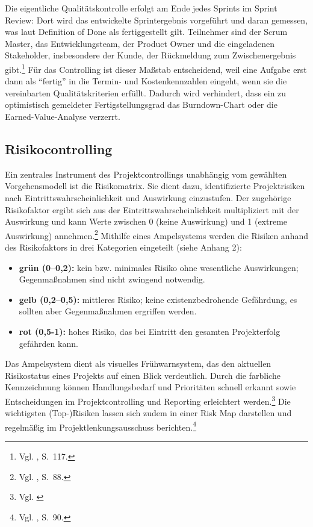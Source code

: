 \documentclass[
    12pt, 
    a4paper,
    ]{scrartcl} %
\begin{document}
Die eigentliche Qualitätskontrolle erfolgt am Ende jedes Sprints im Sprint Review: Dort wird das entwickelte Sprintergebnis vorgeführt und daran gemessen, was laut Definition of Done als fertiggestellt gilt. Teilnehmer sind der Scrum Master, das Entwicklungsteam, der Product Owner und die eingeladenen Stakeholder, insbesondere der Kunde, der Rückmeldung zum Zwischenergebnis gibt.\footnote{Vgl. \cite{Beiderwieden_ProjektmanagementIT}, S.~117.} Für das Controlling ist dieser Maßstab entscheidend, weil eine Aufgabe erst dann als \enquote{fertig} in die Termin- und Kostenkennzahlen eingeht, wenn sie die vereinbarten Qualitätskriterien erfüllt. Dadurch wird verhindert, dass ein zu optimistisch gemeldeter Fertigstellungsgrad das Burndown-Chart oder die Earned-Value-Analyse verzerrt.

\subsection{Risikocontrolling}
Ein zentrales Instrument des Projektcontrollings unabhängig vom gewählten Vorgehensmodell ist die Risikomatrix. Sie dient dazu, identifizierte Projektrisiken nach Eintrittswahrscheinlichkeit und Auswirkung einzustufen. Der zugehörige Risikofaktor ergibt sich aus der Eintrittswahrscheinlichkeit multipliziert mit der Auswirkung und kann Werte zwischen 0 (keine Auswirkung) und 1 (extreme Auswirkung) annehmen.\footnote{Vgl. \cite{Nobach_Projektcontrolling}, S.~88.} Mithilfe eines Ampelsystems werden die Risiken anhand des Risikofaktors in drei Kategorien eingeteilt (siehe Anhang 2):
\begin{itemize}
    \setlength\itemsep{0.4\baselineskip}
    \setlength\parskip{0pt}
    \setlength\parsep{0pt}
    \item \textbf{grün (0–0,2):} kein bzw. minimales Risiko ohne wesentliche Auswirkungen; Gegenmaßnahmen sind nicht zwingend notwendig.
    \item \textbf{gelb (0,2–0,5):} mittleres Risiko; keine existenzbedrohende Gefährdung, es sollten aber Gegenmaßnahmen ergriffen werden.
    \item \textbf{rot (0,5-1):} hohes Risiko, das bei Eintritt den gesamten Projekterfolg gefährden kann.
\end{itemize}
Das Ampelsystem dient als visuelles Frühwarnsystem, das den aktuellen Risikostatus eines Projekts auf einen Blick verdeutlich. Durch die farbliche Kennzeichnung können Handlungsbedarf und Prioritäten schnell erkannt sowie Entscheidungen im Projektcontrolling und Reporting erleichtert werden.\footnote{Vgl. \cite{Factro_Ampelstatus}} Die wichtigsten (Top-)Risiken lassen sich zudem in einer Risk Map darstellen und regelmäßig im Projektlenkungsausschuss berichten.\footnote{Vgl. \cite{Nobach_Projektcontrolling}, S.~90.}
\end{document}
